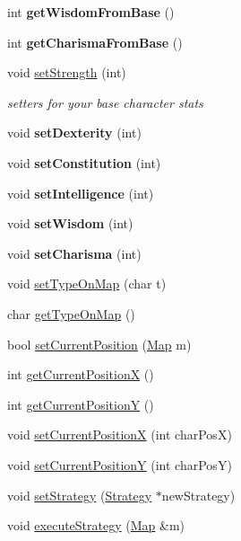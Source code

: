 \begin{DoxyCompactItemize}
\item 
\hypertarget{classCharacter_ac579d07a40589d6abb44f75b95dba847}{}\label{classCharacter_ac579d07a40589d6abb44f75b95dba847} 
int {\bfseries get\+Wisdom\+From\+Base} ()
\item 
\hypertarget{classCharacter_a38fb2dbfbafe81f03365ede8ad95d92b}{}\label{classCharacter_a38fb2dbfbafe81f03365ede8ad95d92b} 
int {\bfseries get\+Charisma\+From\+Base} ()
\item 
void \hyperlink{classCharacter_afb85385ddf9ea03258e3df50184606bd}{set\+Strength} (int)
\begin{DoxyCompactList}\small\item\em setters for your base character stats \end{DoxyCompactList}\item 
\hypertarget{classCharacter_a7a2376d083253985ec93f07b06880f09}{}\label{classCharacter_a7a2376d083253985ec93f07b06880f09} 
void {\bfseries set\+Dexterity} (int)
\item 
\hypertarget{classCharacter_ac4c0552ec6568c89cc6350c7172ac43e}{}\label{classCharacter_ac4c0552ec6568c89cc6350c7172ac43e} 
void {\bfseries set\+Constitution} (int)
\item 
\hypertarget{classCharacter_a5d4ce1fb3f237b7ef9f30f1c97239398}{}\label{classCharacter_a5d4ce1fb3f237b7ef9f30f1c97239398} 
void {\bfseries set\+Intelligence} (int)
\item 
\hypertarget{classCharacter_a53cada6e4dccff94e3d1a067b1062a59}{}\label{classCharacter_a53cada6e4dccff94e3d1a067b1062a59} 
void {\bfseries set\+Wisdom} (int)
\item 
\hypertarget{classCharacter_a01fb8e01e0686ce465fe95e18078aebe}{}\label{classCharacter_a01fb8e01e0686ce465fe95e18078aebe} 
void {\bfseries set\+Charisma} (int)
\item 
void \hyperlink{classCharacter_a509659845edbecfe7806ca1606ec8f18}{set\+Type\+On\+Map} (char t)
\item 
char \hyperlink{classCharacter_a51e80d6194b8c0f4558b593c8e9b58f6}{get\+Type\+On\+Map} ()
\item 
bool \hyperlink{classCharacter_a74d1c28e2a5a4a3618c1f6c54c74fde4}{set\+Current\+Position} (\hyperlink{classMap}{Map} m)
\item 
int \hyperlink{classCharacter_ae0a3d4fb5985bf2101292f7a4fc6b9c2}{get\+Current\+PositionX} ()
\item 
int \hyperlink{classCharacter_aa2b5d86af4a2f086b5f80eac3e209dcc}{get\+Current\+PositionY} ()
\item 
void \hyperlink{classCharacter_aaed0028340719ad6edc3c4fbcc79b726}{set\+Current\+PositionX} (int char\+PosX)
\item 
void \hyperlink{classCharacter_a5a06122e27f7c4baa5ea0f38d95308b5}{set\+Current\+PositionY} (int char\+PosY)
\item 
void \hyperlink{classCharacter_a8a0a60768f62bb565268b7700bcc3ba3}{set\+Strategy} (\hyperlink{classStrategy}{Strategy} $\ast$new\+Strategy)
\item 
void \hyperlink{classCharacter_a67e50bbbfdf69cce320c1b5079f5f052}{execute\+Strategy} (\hyperlink{classMap}{Map} \&m)
\end{DoxyCompactItemize}


